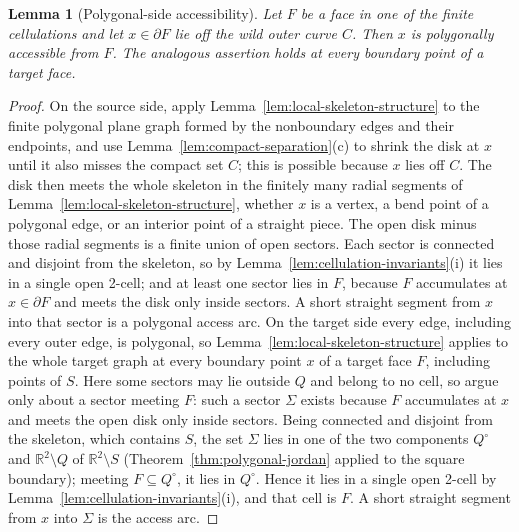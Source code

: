 \documentclass[11pt]{article}
\theoremstyle{mainplain}
\newtheorem{lemma}[theorem]{Lemma}
\theoremstyle{mainroman}
\theoremstyle{definition}
\numberwithin{equation}{section}
\begin{document}
\begin{lemma}[Polygonal-side accessibility]\label{lem:polygonal-side-accessibility}
Let \(F\) be a face in one of the finite cellulations and let
\(x\in\partial F\) lie off the wild outer curve \(C\). Then \(x\) is
polygonally accessible from \(F\). The analogous assertion holds at
every boundary point of a target face.
\end{lemma}
\begin{proof}
On the source side, apply
Lemma~\ref{lem:local-skeleton-structure} to the finite polygonal plane
graph formed by the nonboundary edges and their endpoints, and use
Lemma~\ref{lem:compact-separation}\textup{(c)} to shrink the disk at
\(x\) until it also misses the compact set \(C\); this is possible
because \(x\) lies off \(C\). The disk then meets the whole skeleton
in the finitely many radial segments of
Lemma~\ref{lem:local-skeleton-structure}, whether \(x\) is a vertex, a
bend point of a polygonal edge, or an interior point of a straight
piece. The open disk minus those radial segments is a finite union of open
sectors. Each sector is connected and disjoint from the skeleton, so
by Lemma~\ref{lem:cellulation-invariants}\textup{(i)} it lies in a
single open 2-cell; and at least one sector lies in \(F\), because
\(F\) accumulates at \(x\in\partial F\) and meets the disk only inside
sectors. A short straight segment from \(x\) into that sector is a
polygonal access arc. On the target side every edge, including every
outer edge, is polygonal, so
Lemma~\ref{lem:local-skeleton-structure} applies to the whole target
graph at every boundary point \(x\) of a target face \(F\), including
points of \(S\). Here some sectors may lie outside \(Q\) and belong to
no cell, so argue only about a sector meeting \(F\): such a sector
\(\Sigma\) exists because \(F\) accumulates at \(x\) and meets the
open disk only inside sectors. Being connected and disjoint from the skeleton, which contains
\(S\), the set \(\Sigma\) lies in one of the two components
\(Q^\circ\) and \(\mathbb R^2\setminus Q\) of
\(\mathbb R^2\setminus S\)
(Theorem~\ref{thm:polygonal-jordan} applied to the square boundary);
meeting \(F\subseteq Q^\circ\), it lies in \(Q^\circ\). Hence it lies
in a single open 2-cell by
Lemma~\ref{lem:cellulation-invariants}\textup{(i)}, and that cell is
\(F\). A short straight segment from \(x\) into \(\Sigma\) is the
access arc.
\end{proof}
\end{document}
